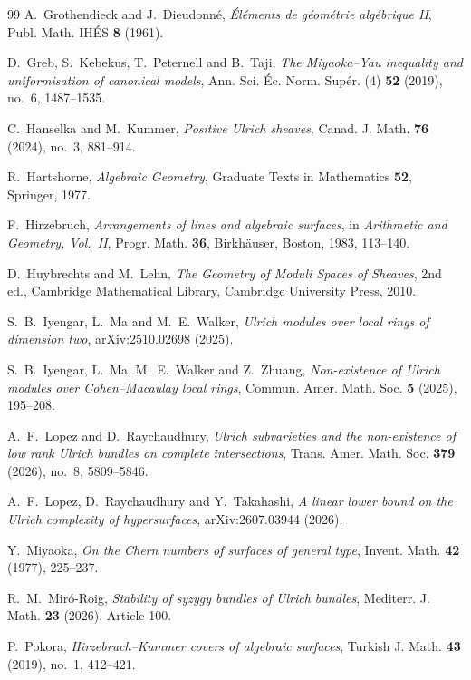 \documentclass[11pt]{article}
\begin{document}
\begin{thebibliography}{99}
A.~Grothendieck and J.~Dieudonn\'e,
\emph{\'El\'ements de g\'eom\'etrie alg\'ebrique II},
Publ. Math. IH\'ES \textbf{8} (1961).

D.~Greb, S.~Kebekus, T.~Peternell and B.~Taji,
\emph{The Miyaoka--Yau inequality and uniformisation of canonical models},
Ann. Sci. \'Ec. Norm. Sup\'er. (4) \textbf{52} (2019), no.~6, 1487--1535.

C.~Hanselka and M.~Kummer,
\emph{Positive Ulrich sheaves},
Canad. J. Math. \textbf{76} (2024), no.~3, 881--914.

R.~Hartshorne,
\emph{Algebraic Geometry},
Graduate Texts in Mathematics \textbf{52}, Springer, 1977.

F.~Hirzebruch,
\emph{Arrangements of lines and algebraic surfaces},
in \emph{Arithmetic and Geometry, Vol.~II},
Progr. Math. \textbf{36}, Birkh\"auser, Boston, 1983, 113--140.

D.~Huybrechts and M.~Lehn,
\emph{The Geometry of Moduli Spaces of Sheaves},
2nd ed., Cambridge Mathematical Library, Cambridge University Press, 2010.

S.~B.~Iyengar, L.~Ma and M.~E.~Walker,
\emph{Ulrich modules over local rings of dimension two},
arXiv:2510.02698 (2025).

S.~B.~Iyengar, L.~Ma, M.~E.~Walker and Z.~Zhuang,
\emph{Non-existence of Ulrich modules over Cohen--Macaulay local rings},
Commun. Amer. Math. Soc. \textbf{5} (2025), 195--208.

A.~F.~Lopez and D.~Raychaudhury,
\emph{Ulrich subvarieties and the non-existence of low rank Ulrich bundles on complete intersections},
Trans. Amer. Math. Soc. \textbf{379} (2026), no.~8, 5809--5846.

A.~F.~Lopez, D.~Raychaudhury and Y.~Takahashi,
\emph{A linear lower bound on the Ulrich complexity of hypersurfaces},
arXiv:2607.03944 (2026).

Y.~Miyaoka,
\emph{On the Chern numbers of surfaces of general type},
Invent. Math. \textbf{42} (1977), 225--237.

R.~M.~Mir\'o-Roig,
\emph{Stability of syzygy bundles of Ulrich bundles},
Mediterr. J. Math. \textbf{23} (2026), Article 100.

P.~Pokora,
\emph{Hirzebruch--Kummer covers of algebraic surfaces},
Turkish J. Math. \textbf{43} (2019), no.~1, 412--421.


\end{thebibliography}
\end{document}
